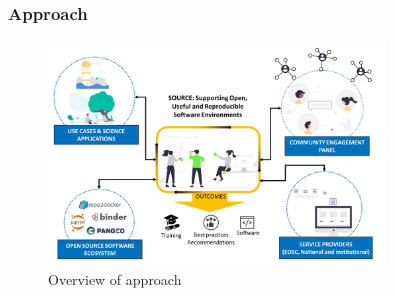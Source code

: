 

\subsubsection{Approach}\label{sec:methodology}

\begin{figure}[htb]
  \centerline{
    \includegraphics[width=0.80\textwidth]{images/approach.png}
    }
  \caption{Overview of \TheProject approach} \label{fig:overview-approach}
\end{figure}

